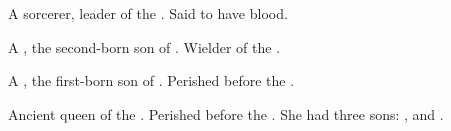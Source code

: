 \begin{gloss}
\begin{comment}
\paragraph{\LocarPsyrex}
\end{comment}
\gitemcharacter{\LocarPsyrex}{\scatha}{\male}
A  sorcerer, leader of the . 
Said to have  blood. 







\begin{comment}
\paragraph{\QuessanthIshnaruchaefir}
\end{comment}
\gitemcharacter{\QuessanthIshnaruchaefir}{\dragon}{\male}
A , the second-born son of . 
Wielder of the  \Triestessakhin. 







\begin{comment}
\paragraph{\RaemythKhivaashNexagglachel}
\end{comment}
\gitemcharacter{\RaemythKhivaashNexagglachel}{\dragon}{\male}
A , the first-born son of . 
Perished before the \secondbanewar. 







\begin{comment}
\paragraph{\TyarithXserasshana}
\end{comment}
\gitemcharacter{\TyarithXserasshana}{\dragon}{\female}
Ancient queen of the . 
Perished before the \secondbanewar. 
She had three sons: 
,  and . 








\end{gloss}
